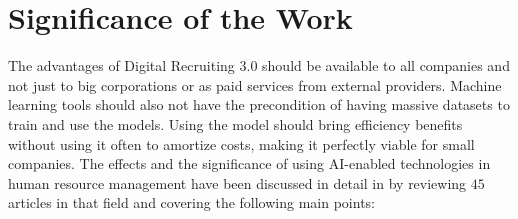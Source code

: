 \documentclass[draft,final]{thesisclass} %
\begin{document}
\section{Significance of the Work} \label{significance_of_the_work}
The advantages of Digital Recruiting 3.0 should be available to all companies and not just to big corporations or as paid services from external providers.
Machine learning tools should also not have the precondition of having massive datasets to train and use the models.
Using the model should bring efficiency benefits without using it often to amortize costs, making it perfectly viable for small companies.
The effects and the significance of using \acs{AI}-enabled technologies in human resource management have been discussed in detail in \textcite{ai_hrm_review} by reviewing $45$ articles in that field and covering the following main points:
\end{document}
